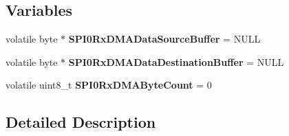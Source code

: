 \subsection*{Variables}
\begin{DoxyCompactItemize}
\item 
\hypertarget{group___d_m_a_t___m___s_p_i___r_x__module_gaec0c7bbae454d68acac84afc8d7a6319}{volatile byte $\ast$ {\bfseries S\-P\-I0\-Rx\-D\-M\-A\-Data\-Source\-Buffer} = N\-U\-L\-L}\label{group___d_m_a_t___m___s_p_i___r_x__module_gaec0c7bbae454d68acac84afc8d7a6319}

\item 
\hypertarget{group___d_m_a_t___m___s_p_i___r_x__module_ga5ebc388863f0f751162da7451b5e6da6}{volatile byte $\ast$ {\bfseries S\-P\-I0\-Rx\-D\-M\-A\-Data\-Destination\-Buffer} = N\-U\-L\-L}\label{group___d_m_a_t___m___s_p_i___r_x__module_ga5ebc388863f0f751162da7451b5e6da6}

\item 
\hypertarget{group___d_m_a_t___m___s_p_i___r_x__module_ga8773080b35e9c0c3c7d706d7eac1e8d3}{volatile uint8\-\_\-t {\bfseries S\-P\-I0\-Rx\-D\-M\-A\-Byte\-Count} = 0}\label{group___d_m_a_t___m___s_p_i___r_x__module_ga8773080b35e9c0c3c7d706d7eac1e8d3}

\end{DoxyCompactItemize}


\subsection{Detailed Description}


